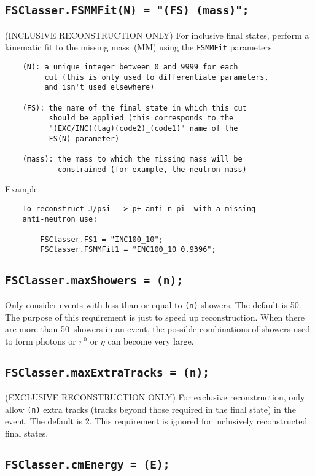 \documentclass[11pt,a4paper]{define/cepcnote}
\begin{document}
\subsection{\tt FSClasser.FSMMFit(N) = "(FS) (mass)";}

(INCLUSIVE RECONSTRUCTION ONLY) For inclusive final states, perform a kinematic fit to the missing mass~(MM) using the {\tt FSMMFit} parameters.
\begin{verbatim}
    (N): a unique integer between 0 and 9999 for each 
         cut (this is only used to differentiate parameters, 
         and isn't used elsewhere)

    (FS): the name of the final state in which this cut
          should be applied (this corresponds to the
          "(EXC/INC)(tag)(code2)_(code1)" name of the
          FS(N) parameter) 

    (mass): the mass to which the missing mass will be
            constrained (for example, the neutron mass)
\end{verbatim}
Example:
\begin{verbatim}
    To reconstruct J/psi --> p+ anti-n pi- with a missing 
    anti-neutron use:

        FSClasser.FS1 = "INC100_10";
        FSClasser.FSMMFit1 = "INC100_10 0.9396";
\end{verbatim}


\subsection{\tt FSClasser.maxShowers = (n);}

Only consider events with less than or equal to {\tt (n)} showers.  The default is 50.  The purpose of this requirement is just to speed up reconstruction.  When there are more than 50~showers in an event, the possible combinations of showers used to form photons or $\pi^0$ or $\eta$ can become very large.


\subsection{\tt FSClasser.maxExtraTracks = (n);}

(EXCLUSIVE RECONSTRUCTION ONLY) For exclusive reconstruction, only allow {\tt (n)} extra tracks (tracks beyond those required in the final state) in the event.  The default is 2.  This requirement is ignored for inclusively reconstructed final states.


\subsection{\tt FSClasser.cmEnergy = (E);}
\end{document}
